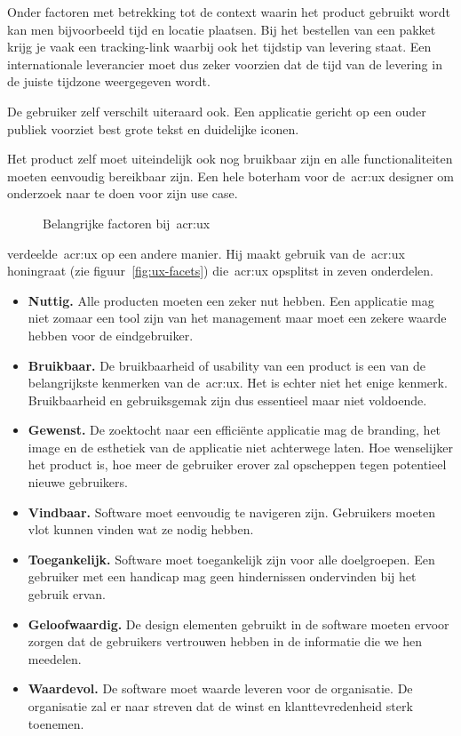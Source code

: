 Onder factoren met betrekking tot de context waarin het product gebruikt wordt kan men bijvoorbeeld tijd en locatie plaatsen. Bij het bestellen van een pakket krijg je vaak een tracking-link waarbij ook het tijdstip van levering staat. Een internationale leverancier moet dus zeker voorzien dat de tijd van de levering in de juiste tijdzone weergegeven wordt.

De gebruiker zelf verschilt uiteraard ook. Een applicatie gericht op een ouder publiek voorziet best grote tekst en duidelijke iconen.

Het product zelf moet uiteindelijk ook nog bruikbaar zijn en alle functionaliteiten moeten eenvoudig bereikbaar zijn.
Een hele boterham voor de~\acrlong{acr:ux} designer om onderzoek naar te doen voor zijn use case.

\begin{figure}
    \centering
    \def\svgwidth{.8\columnwidth}
    
    \caption{Belangrijke factoren bij~\acrlong{acr:ux}}
    \label{fig:ux-factoren}
\end{figure}

\textcite{Morville2004} verdeelde~\acrlong{acr:ux} op een andere manier. Hij maakt gebruik van de~\acrlong{acr:ux} honingraat (zie figuur~\ref{fig:ux-facets}) die~\acrlong{acr:ux} opsplitst in zeven onderdelen.

\begin{itemize}
    \item \textbf{Nuttig.}
    Alle producten moeten een zeker nut hebben. Een applicatie mag niet zomaar een tool zijn van het management maar moet een zekere waarde hebben voor de eindgebruiker.
    \item \textbf{Bruikbaar.}
    De bruikbaarheid of usability van een product is een van de belangrijkste kenmerken van de~\acrlong{acr:ux}. Het is echter niet het enige kenmerk. Bruikbaarheid en gebruiksgemak zijn dus essentieel maar niet voldoende.
    \item \textbf{Gewenst.}
    De zoektocht naar een efficiënte applicatie mag de branding, het image en de esthetiek van de applicatie niet achterwege laten. Hoe wenselijker het product is, hoe meer de gebruiker erover zal opscheppen tegen potentieel nieuwe gebruikers.
    \item \textbf{Vindbaar.}
    Software moet eenvoudig te navigeren zijn. Gebruikers moeten vlot kunnen vinden wat ze nodig hebben.
    \item \textbf{Toegankelijk.}
    Software moet toegankelijk zijn voor alle doelgroepen. Een gebruiker met een handicap mag geen hindernissen ondervinden bij het gebruik ervan.
    \item \textbf{Geloofwaardig.}
    De design elementen gebruikt in de software moeten ervoor zorgen dat de gebruikers vertrouwen hebben in de informatie die we hen meedelen.
    \item \textbf{Waardevol.}
    De software moet waarde leveren voor de organisatie. De organisatie zal er naar streven dat de winst en klanttevredenheid sterk toenemen.
\end{itemize}

